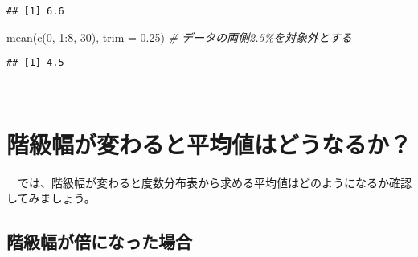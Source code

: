 \documentclass[
  12pt,
]{book}
\newenvironment{Shaded}{\begin{snugshade}}{\end{snugshade}}
\newcommand{\AttributeTok}[1]{\textcolor[rgb]{0.77,0.63,0.00}{#1}}
\newcommand{\CommentTok}[1]{\textcolor[rgb]{0.56,0.35,0.01}{\textit{#1}}}
\newcommand{\DecValTok}[1]{\textcolor[rgb]{0.00,0.00,0.81}{#1}}
\newcommand{\FloatTok}[1]{\textcolor[rgb]{0.00,0.00,0.81}{#1}}
\newcommand{\FunctionTok}[1]{\textcolor[rgb]{0.00,0.00,0.00}{#1}}
\newcommand{\NormalTok}[1]{#1}
\newcommand{\SpecialCharTok}[1]{\textcolor[rgb]{0.00,0.00,0.00}{#1}}
\begin{document}
\begin{verbatim}
## [1] 6.6
\end{verbatim}

\begin{Shaded}
\begin{Highlighting}[]
\FunctionTok{mean}\NormalTok{(}\FunctionTok{c}\NormalTok{(}\DecValTok{0}\NormalTok{, }\DecValTok{1}\SpecialCharTok{:}\DecValTok{8}\NormalTok{, }\DecValTok{30}\NormalTok{), }\AttributeTok{trim =} \FloatTok{0.25}\NormalTok{)  }\CommentTok{\# データの両側2.5\%を対象外とする}
\end{Highlighting}
\end{Shaded}

\begin{verbatim}
## [1] 4.5
\end{verbatim}

　

\hypertarget{ux968eux7d1aux5e45ux304cux5909ux308fux308bux3068ux5e73ux5747ux5024ux306fux3069ux3046ux306aux308bux304b}{%
\section*{階級幅が変わると平均値はどうなるか？}\label{ux968eux7d1aux5e45ux304cux5909ux308fux308bux3068ux5e73ux5747ux5024ux306fux3069ux3046ux306aux308bux304b}}

　では、階級幅が変わると度数分布表から求める平均値はどのようになるか確認してみましょう。

\hypertarget{ux968eux7d1aux5e45ux304cux500dux306bux306aux3063ux305fux5834ux5408}{%
\subsection*{階級幅が倍になった場合}\label{ux968eux7d1aux5e45ux304cux500dux306bux306aux3063ux305fux5834ux5408}}
\end{document}
